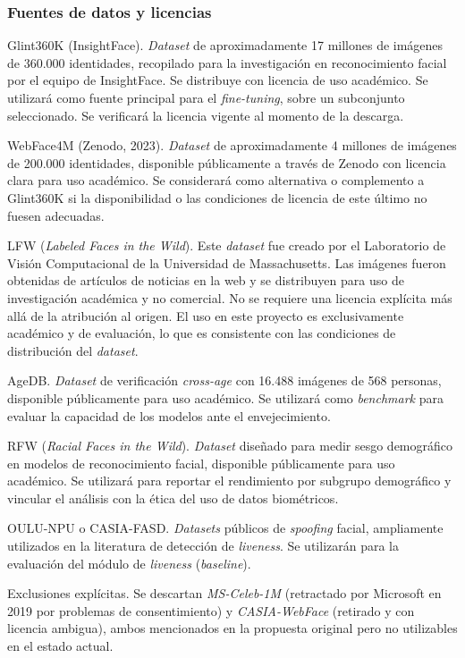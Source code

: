 \documentclass[
  11pt, %
]{charter}
\begin{document}
\subsubsection{Fuentes de datos y licencias}

Glint360K (InsightFace). \textit{Dataset} de aproximadamente 17 millones de imágenes de 360.000 identidades, recopilado para la investigación en reconocimiento facial por el equipo de InsightFace. Se distribuye con licencia de uso académico. Se utilizará como fuente principal para el \textit{fine-tuning}, sobre un subconjunto seleccionado. Se verificará la licencia vigente al momento de la descarga.

WebFace4M (Zenodo, 2023). \textit{Dataset} de aproximadamente 4 millones de imágenes de 200.000 identidades, disponible públicamente a través de Zenodo con licencia clara para uso académico. Se considerará como alternativa o complemento a Glint360K si la disponibilidad o las condiciones de licencia de este último no fuesen adecuadas.

LFW (\textit{Labeled Faces in the Wild}). Este \textit{dataset} fue creado por el Laboratorio de Visión Computacional de la Universidad de Massachusetts. Las imágenes fueron obtenidas de artículos de noticias en la web y se distribuyen para uso de investigación académica y no comercial. No se requiere una licencia explícita más allá de la atribución al origen. El uso en este proyecto es exclusivamente académico y de evaluación, lo que es consistente con las condiciones de distribución del \textit{dataset}.

AgeDB. \textit{Dataset} de verificación \textit{cross-age} con 16.488 imágenes de 568 personas, disponible públicamente para uso académico. Se utilizará como \textit{benchmark} para evaluar la capacidad de los modelos ante el envejecimiento.

RFW (\textit{Racial Faces in the Wild}). \textit{Dataset} diseñado para medir sesgo demográfico en modelos de reconocimiento facial, disponible públicamente para uso académico. Se utilizará para reportar el rendimiento por subgrupo demográfico y vincular el análisis con la ética del uso de datos biométricos.

OULU-NPU o CASIA-FASD. \textit{Datasets} públicos de \textit{spoofing} facial, ampliamente utilizados en la literatura de detección de \textit{liveness}. Se utilizarán para la evaluación del módulo de \textit{liveness} (\textit{baseline}).

Exclusiones explícitas. Se descartan \textit{MS-Celeb-1M} (retractado por Microsoft en 2019 por problemas de consentimiento) y \textit{CASIA-WebFace} (retirado y con licencia ambigua), ambos mencionados en la propuesta original pero no utilizables en el estado actual.
\end{document}
